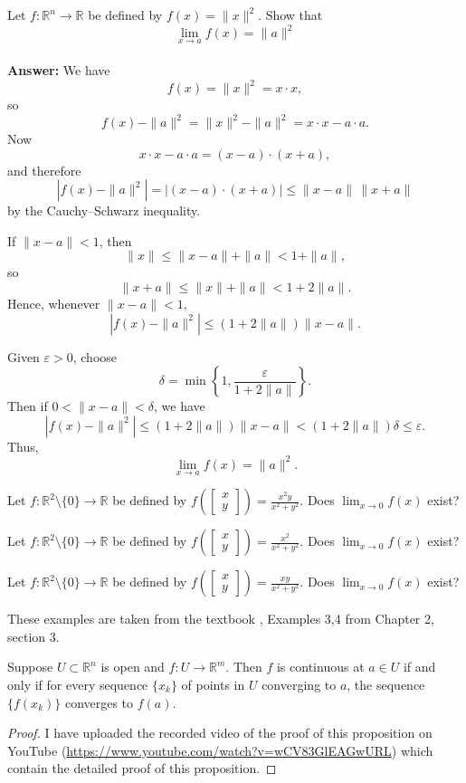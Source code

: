 \begin{example}
Let $f:\mathbb R^n\rightarrow\mathbb R$ be defined by $f(x)=\|x\|^2$. Show that $$\lim_{x\to a} f(x)=\|a\|^2$$\\
\textbf{Answer: }We have
\[
f(x)=\|x\|^2=x\cdot x,
\]
so
\[
f(x)-\|a\|^2=\|x\|^2-\|a\|^2=x\cdot x-a\cdot a.
\]
Now
\[
x\cdot x-a\cdot a=(x-a)\cdot(x+a),
\]
and therefore
\[
|f(x)-\|a\|^2|
= |(x-a)\cdot(x+a)|
\le \|x-a\|\,\|x+a\|
\]
by the Cauchy--Schwarz inequality.

If $\|x-a\|<1$, then
\[
\|x\|\le \|x-a\|+\|a\|<1+\|a\|,
\]
so
\[
\|x+a\|\le \|x\|+\|a\|<1+2\|a\|.
\]
Hence, whenever $\|x-a\|<1$,
\[
|f(x)-\|a\|^2|
\le (1+2\|a\|)\|x-a\|.
\]

Given $\varepsilon>0$, choose
\[
\delta=\min\left\{1,\frac{\varepsilon}{1+2\|a\|}\right\}.
\]
Then if $0<\|x-a\|<\delta$, we have
\[
|f(x)-\|a\|^2|
\le (1+2\|a\|)\|x-a\|
< (1+2\|a\|)\delta
\le \varepsilon.
\]
Thus,
\[
\lim_{x\to a} f(x)=\|a\|^2.
\]
\end{example}

\begin{example}
Let $f:\mathbb R^2\setminus\{0\}\rightarrow\mathbb R$ be defined by $f\left(\begin{bmatrix}
x\\y
\end{bmatrix}\right)=\frac{x^2y}{x^2+y^2}$. Does $\lim_{x\to 0} f(x)$ exist?
\end{example}

\begin{example}
Let $f:\mathbb R^2\setminus\{0\}\rightarrow\mathbb R$ be defined by $f\left(\begin{bmatrix}
    x\\y
\end{bmatrix}\right)=\frac{x^2}{x^2+y^2}$. Does $\lim_{x\to 0} f(x)$ exist?
\end{example} 

\begin{example}
Let $f:\mathbb R^2\setminus\{0\}\rightarrow\mathbb R$ be defined by $f\left(\begin{bmatrix}
    x\\y
\end{bmatrix}\right)=\frac{xy}{x^2+y^2}$. Does $\lim_{x\to 0} f(x)$ exist?
\end{example} 
These examples are taken from the textbook \cite{shifrin}, Examples 3,4 from Chapter 2, section 3.
\begin{proposition}
Suppose $U\subset\mathbb R^n$ is open and $f:U\rightarrow\mathbb R^m$. Then $f$ is continuous at $a\in U$ if and only if for every sequence $\{x_k\}$ of points in $U$ converging to $a$, the sequence $\{f(x_k)\}$ converges to $f(a)$.
\end{proposition}
\begin{proof}
    I have uploaded the recorded video of the proof of this proposition on YouTube (\url{https://www.youtube.com/watch?v=wCV83GlEAGwURL}) which contain the detailed proof of this proposition.

\end{proof}  